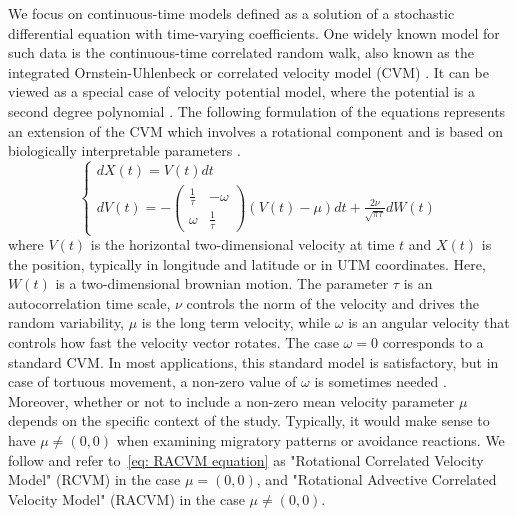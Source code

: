 \documentclass[11pt]{article}
\newcommand {\1}{\mathbb{1}}
\theoremstyle{definition}
\theoremstyle{remark}
\theoremstyle{remark}
\begin{document}
We focus on continuous-time models defined as a solution of a stochastic differential equation with time-varying coefficients. One widely known model for such data is the continuous-time correlated random walk, also known as the integrated Ornstein-Uhlenbeck or correlated velocity model (CVM) \cite{johnson_continuoustime_2008}. It can be viewed as a special case of velocity potential model, where the potential is a second degree polynomial \cite{preisler_analyzing_2013}. The following formulation of the equations represents an extension of the CVM which involves a rotational component and  is based on biologically interpretable parameters \cite{gurarie_correlated_2017}.
\begin{equation} \left\{
	\begin{array}{l}
		dX(t)=V(t)dt \\
		dV(t)=-\begin{pmatrix} 
			\frac{1}{\tau} & -\omega \\
			\omega & \frac{1}{\tau}
		\end{pmatrix}(V(t)-\mu)dt+\frac{2\nu}{\sqrt{\pi \tau}} dW(t) 
	\end{array}
	\right.
	\label{eq: RACVM equation}
\end{equation}
where $V(t)$ is the horizontal two-dimensional velocity at time $t$ and $X(t)$ is the position, typically in longitude and latitude or in UTM coordinates. Here, $W(t)$ is a two-dimensional brownian motion. 
The parameter $\tau$ is an autocorrelation time scale, $\nu$ controls the norm of the velocity and drives the random variability, $\mu$ is the long term velocity, while $\omega$ is an angular velocity that controls how fast the velocity vector rotates. The case $\omega=0$ corresponds to a standard CVM. In most applications, this standard model is satisfactory, but in case of tortuous movement, a non-zero value of $\omega$ is sometimes needed \cite{gurarie_correlated_2017,alt_correlation_1990,albertsen_generalizing_2018}. Moreover, whether or not to include a non-zero mean velocity parameter $\mu$ depends on the specific context of the study. Typically, it would make sense to have $\mu\neq (0,0)$ when examining migratory patterns or avoidance reactions. We follow \cite{gurarie_correlated_2017} and refer to~\ref{eq: RACVM equation} as "Rotational Correlated Velocity Model" (RCVM) in the case $\mu=(0,0)$, and "Rotational Advective Correlated Velocity Model" (RACVM) in the case $\mu \neq (0,0)$.\\
\end{document}
